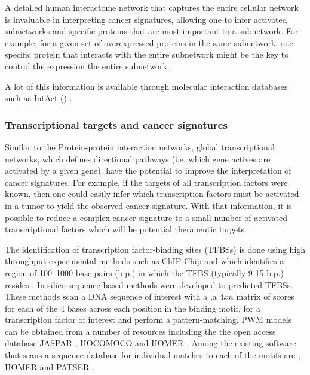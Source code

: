 A detailed human interactome network that captures the entire cellular network is invaluable in interpreting cancer signatures, allowing one to infer activated subnetworks and specific proteins that are most important to a subnetwork. For example, for a given set of overexpressed proteins in the same subnetwork, one specific protein that interacts with the entire subnetwork might be the key to control the expression the entire subnetwork.

 A lot of this information is available through molecular interaction databases such as IntAct () \cite{orchard2013mintact}.

\subsubsection{Transcriptional targets and cancer signatures}

Similar to the Protein-protein interaction networks, global transcriptional networks, which defines directional pathways (i.e. which gene actives are activated by a given gene), have the potential to improve the interpretation of cancer signatures. For example, if the targets of all transcription factors  were known, then one could easily infer which transcription factors must be activated in a tumor to yield the observed cancer signature. With that information, it is possible to reduce a complex cancer signature to a small number of activated transcriptional factors which will be potential therapeutic targets.

The identification of transcription factor-binding sites (TFBSs) is done using high throughput experimental methods  such as ChIP-Chip and   which identifies a region of 100–1000
base pairs (b.p.) in which the TFBS
(typically 9-15 b.p.) resides \cite{jayaram2016evaluating}.
In-silico  sequence-based methods were developed to predicted TFBSs. These methods scan
 a DNA sequence of interest
with a ,a $4 x n$ matrix of
scores for each of the 4 bases across each position in the
binding motif, for a transcription factor of interest and perform a pattern-matching.
PWM models can be obtained from a number of resources including the the open access database JASPAR \cite{portales2009jaspar}, HOCOMOCO \cite{kulakovskiy2013hocomoco} and HOMER \cite{heinz2010simple}. Among the existing  software that scans a sequence database for individual matches to each of the motifs are  \cite{grant2011fimo}, HOMER \cite{heinz2010simple} and PATSER \cite{turatsinze2008using}.

